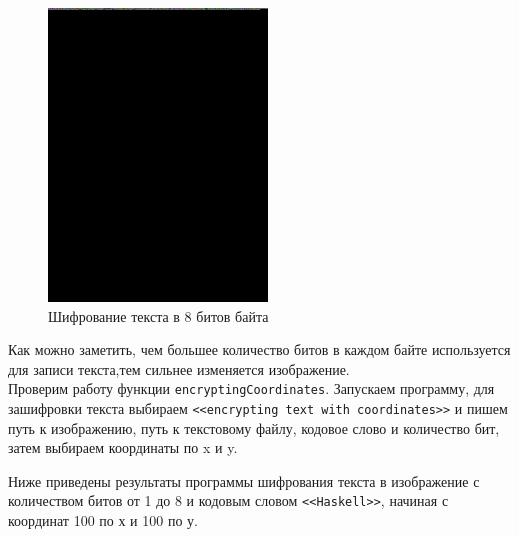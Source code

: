 \documentclass[10pt,a4paper,final]{article} %
\begin{document}
\begin{figure}[h!]
\begin{minipage}{0.3\textwidth}
		\includegraphics[width=\linewidth]{img/Haskell_8}
		\caption{Шифрование текста в 8 битов байта}
	\end{minipage}
\end{figure}

Как можно заметить, чем большее количество битов в каждом байте используется для записи текста,тем сильнее изменяется изображение.\\







Проверим работу функции \texttt{encryptingCoordinates}.
Запускаем программу, для зашифровки текста выбираем \texttt{<<encrypting text with coordinates>>} и пишем путь к изображению, путь к текстовому файлу, кодовое слово и количество бит, затем выбираем координаты по x и y.


Ниже приведены результаты программы шифрования текста в изображение с количеством битов от 1 до 8 и кодовым словом \texttt{<<Haskell>>}, начиная с координат 100 по х и 100 по у.
\end{document}
